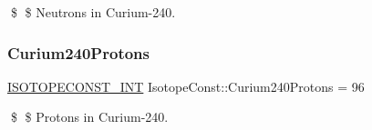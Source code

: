 \$ \$ Neutrons in Curium-\/240. \mbox{\label{group___isotope_const-_curium-_cm240_ga5d6c677206a46ca2f38fcfae030c9641}} 
\subsubsection{\texorpdfstring{Curium240\+Protons}{Curium240Protons}}
{\footnotesize\ttfamily \mbox{\hyperlink{group___isotope_const-_macros_ga5f18360b3e99483a35c32d789e62621c}{I\+S\+O\+T\+O\+P\+E\+C\+O\+N\+S\+T\+\_\+\+I\+NT}} Isotope\+Const\+::\+Curium240\+Protons = 96}

\$ \$ Protons in Curium-\/240. 
